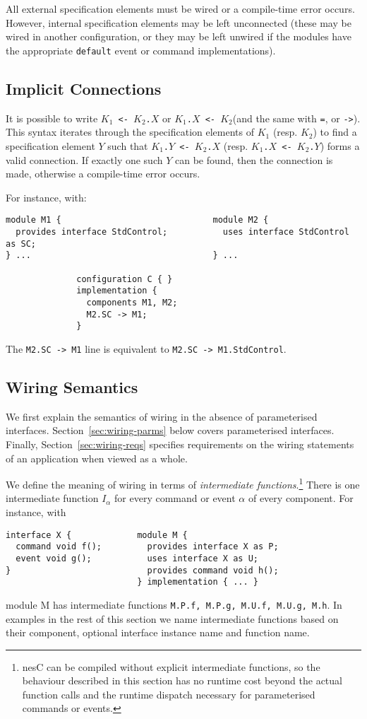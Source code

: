 \documentclass[11pt]{article}
\newcommand{\kw}[1]{{\tt #1}}
\newcommand{\code}[1]{{\tt #1}}
\newcommand{\nesc}{nesC\xspace}
\begin{document}
All external specification elements must be wired or a compile-time error
occurs. However, internal specification elements may be left unconnected
(these may be wired in another configuration, or they may be left unwired
if the modules have the appropriate \kw{default} event or command
implementations).

\subsection{Implicit Connections}
\label{sec:implicit}

It is possible to write \code{$K_1$ <- $K_2$.$X$} or \code{$K_1$.$X$ <-
$K_2$}(and the same with \kw{=}, or \kw{->}). This syntax iterates through
the specification elements of $K_1$ (resp. $K_2$) to find a specification
element $Y$ such that \code{$K_1$.$Y$ <- $K_2$.$X$} (resp. \code{$K_1$.$X$
<- $K_2$.$Y$}) forms a valid connection. If exactly one such $Y$ can
be found, then the connection is made, otherwise a compile-time error
occurs.

For instance, with:
\begin{verbatim}
module M1 {                              module M2 {
  provides interface StdControl;           uses interface StdControl as SC;
} ...                                    } ...

              configuration C { }
              implementation {
                components M1, M2;
                M2.SC -> M1;
              }
\end{verbatim}
The \code{M2.SC -> M1} line is equivalent to \code{M2.SC -> M1.StdControl}.

\subsection{Wiring Semantics}
\label{sec:wiring-semantics}

We first explain the semantics of wiring in the absence of parameterised
interfaces. Section~\ref{sec:wiring-parms} below covers parameterised
interfaces. Finally, Section~\ref{sec:wiring-reqs} specifies requirements
on the wiring statements of an application when viewed as a whole.

We define the meaning of wiring in terms of \emph{intermediate
functions}.\footnote{\nesc can be compiled without explicit intermediate
functions, so the behaviour described in this section has no runtime cost
beyond the actual function calls and the runtime dispatch necessary for
parameterised commands or events.}  There is one intermediate function
$I_\alpha$ for every command or event $\alpha$ of every component. For
instance, with
\begin{verbatim}
interface X {             module M {
  command void f();         provides interface X as P;
  event void g();           uses interface X as U;
}                           provides command void h();
                          } implementation { ... }
\end{verbatim}
module M has intermediate functions \code{M.P.f, M.P.g, M.U.f, M.U.g, M.h}.
In examples in the rest of this section we name intermediate functions
based on their component, optional interface instance name and function
name.
\end{document}
